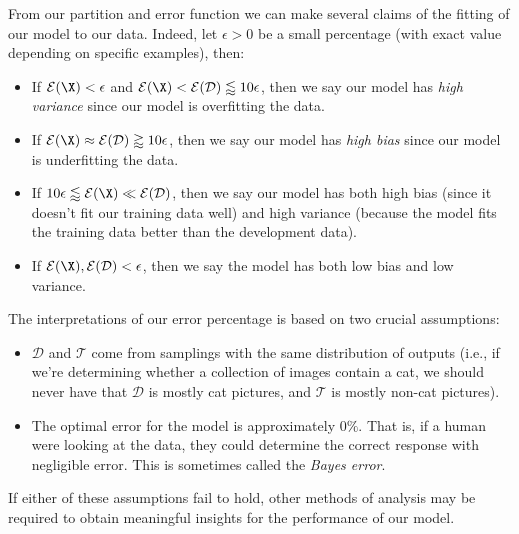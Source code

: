 From our partition and error function we can make several claims of the fitting of our model to our data.  Indeed, let $\epsilon>0$ be a small percentage (with exact value depending on specific examples), then:
\begin{itemize}
	\item If $\mathcal{E}(\X)<\epsilon$ and $\mathcal{E}(\X)<\mathcal{E}(\mathcal{D})\lessapprox10\epsilon$, then we say our model has \textit{high variance} since our model is overfitting the data.
	\item If $\mathcal{E}(\X)\approx\mathcal{E}(\mathcal{D})\gtrapprox10\epsilon$, then we say our model has \textit{high bias} since our model is underfitting the data.
	\item If $10\epsilon\lessapprox\mathcal{E}(\X)\ll\mathcal{E}(\mathcal{D})$, then we say our model has both high bias (since it doesn't fit our training data well) and high variance (because the model fits the training data better than the development data).
	\item If $\mathcal{E}(\X),\mathcal{E}(\mathcal{D})<\epsilon$, then we say the model has both low bias and low variance.
\end{itemize}

\begin{remark}
	The interpretations of our error percentage is based on two crucial assumptions:
	\begin{itemize}
		\item $\mathcal{D}$ and $\mathcal{T}$ come from samplings with the same distribution of outputs (i.e., if we're determining whether a collection of images contain a cat, we should never have that $\mathcal{D}$ is mostly cat pictures, and $\mathcal{T}$ is mostly non-cat pictures).
		\item The optimal error for the model is approximately $0\%$.  That is, if a human were looking at the data, they could determine the correct response with negligible error.  This is sometimes called the \textit{Bayes error}.
	\end{itemize}
	If either of these assumptions fail to hold, other methods of analysis may be required to obtain meaningful insights for the performance of our model.
\end{remark}

